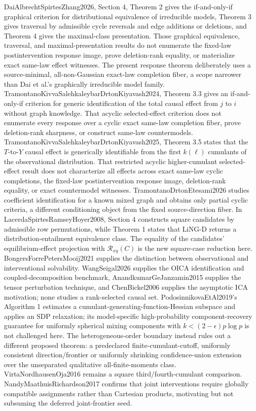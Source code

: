 \documentclass{article}
\begin{document}
DaiAlbrechtSpirtesZhang2026, Section 4, Theorem 2 gives the if-and-only-if graphical criterion for distributional equivalence of irreducible models, Theorem 3 gives traversal by admissible cycle reversals and edge additions or deletions, and Theorem 4 gives the maximal-class presentation. Those graphical equivalence, traversal, and maximal-presentation results do not enumerate the fixed-law postintervention response image, prove deletion-rank equality, or materialize exact same-law effect witnesses. The present response theorem deliberately uses a source-minimal, all-non-Gaussian exact-law completion fiber, a scope narrower than Dai et al.'s graphically irreducible model family. TramontanoKivvaSalehkaleybarDrtonKiyavash2024, Theorem 3.3 gives an if-and-only-if criterion for generic identification of the total causal effect from \(j\) to \(i\) without graph knowledge. That acyclic selected-effect criterion does not enumerate every response over a cyclic exact same-law completion fiber, prove deletion-rank sharpness, or construct same-law countermodels. TramontanoKivvaSalehkaleybarDrtonKiyavash2025, Theorem 3.5 states that the \(T\)-to-\(Y\) causal effect is generically identifiable from the first \(k(\ell)\) cumulants of the observational distribution. That restricted acyclic higher-cumulant selected-effect result does not characterize all effects across exact same-law cyclic completions, the fixed-law postintervention response image, deletion-rank equality, or exact countermodel witnesses. TramontanoDrtonEtesami2026 studies coefficient identification for a known mixed graph and obtains only partial cyclic criteria, a different conditioning object from the fixed source-direction fiber. In LacerdaSpirtesRamseyHoyer2008, Section 4 constructs square candidates by admissible row permutations, while Theorem 1 states that LiNG-D returns a distribution-entailment equivalence class. The equality of the candidates' equilibrium-effect projection with \(\mathcal R_{xy}(C)\) is the new square-case reduction here. BongersForrePetersMooij2021 supplies the distinction between observational and interventional solvability. WangSeigal2026 supplies the OICA identification and coupled-decomposition benchmark, AnandkumarGeJanzamin2015 supplies the tensor perturbation technique, and ChenBickel2006 supplies the asymptotic ICA motivation; none studies a rank-selected causal set. PodosinnikovaEtAl2019's Algorithm 1 estimates a cumulant-generating-function-Hessian subspace and applies an SDP relaxation; its model-specific high-probability component-recovery guarantee for uniformly spherical mixing components with \(k<(2-\epsilon)p\log p\) is not challenged here. The heterogeneous-order boundary instead rules out a different proposed theorem: a predeclared finite-cumulant-cutoff, uniformly consistent direction/frontier or uniformly shrinking confidence-union extension over the unseparated qualitative all-finite-moments class. VirtaNordhausenOja2016 remains a square third/fourth-cumulant comparison. NandyMaathuisRichardson2017 confirms that joint interventions require globally compatible assignments rather than Cartesian products, motivating but not subsuming the deferred joint-frontier seed.
\end{document}
